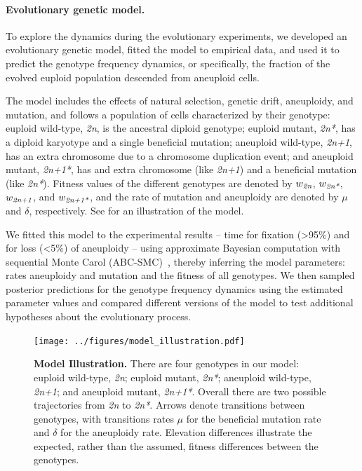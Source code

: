 \documentclass[12pt]{extarticle}
\newcommand{\euwt}{\emph{2n}}
\newcommand{\anwt}{\emph{2n+1}}
\newcommand{\eumt}{\emph{2n*}}
\newcommand{\anmt}{\emph{2n+1*}}
\begin{document}
\paragraph{Evolutionary genetic model.} 
To explore the dynamics during the evolutionary experiments, we developed an evolutionary genetic model, fitted the model to empirical data, and used it to predict the genotype frequency dynamics, or specifically, the fraction of the evolved euploid population descended from aneuploid cells. 

The model includes the effects of natural selection, genetic drift, aneuploidy, and mutation, and follows a population of cells characterized by their genotype: 
euploid wild-type, \euwt, is the ancestral diploid genotype; 
euploid mutant, \eumt, has a diploid karyotype and a single beneficial mutation; 
aneuploid wild-type, \anwt, has an extra chromosome due to a chromosome duplication event; and
aneuploid mutant, \anmt, has and extra chromosome (like \anwt) and a beneficial mutation (like \eumt).
Fitness values of the different genotypes are denoted by $w_{\euwt}$, $w_{\eumt}$, $w_{\anwt}$, and $w_{\anmt}$, and the rate of mutation and aneuploidy are denoted by $\mu$ and $\delta$, respectively.
See  for an illustration of the model.

We fitted this model to the experimental results\citep{Yona2012} -- time for fixation (>95\%) and for loss (<5\%) of aneuploidy -- using approximate Bayesian computation with sequential Monte Carol (ABC-SMC)~\citep{Sisson2009}, thereby inferring the model parameters: rates aneuploidy and mutation and the fitness of all genotypes.
We then sampled posterior predictions for the genotype frequency dynamics using the estimated parameter values and compared different versions of the model to test additional hypotheses about the evolutionary process.


\begin{figure}[h]
  \centering
    \texttt{[image: ../figures/model\_illustration.pdf]}      
  \caption{
    \textbf{Model Illustration.}
    There are four genotypes in our model: euploid wild-type, \euwt; euploid mutant, \eumt; aneuploid wild-type, \anwt; and aneuploid mutant, \anmt.
    Overall there are two possible trajectories from \euwt\; to \eumt.
    Arrows denote transitions between genotypes, with transitions rates $\mu$ for the beneficial mutation rate and $\delta$ for the aneuploidy rate.
    Elevation differences illustrate the expected, rather than the assumed, fitness differences between the genotypes.
   }
  \label{fig:models}
\end{figure}
\end{document}
